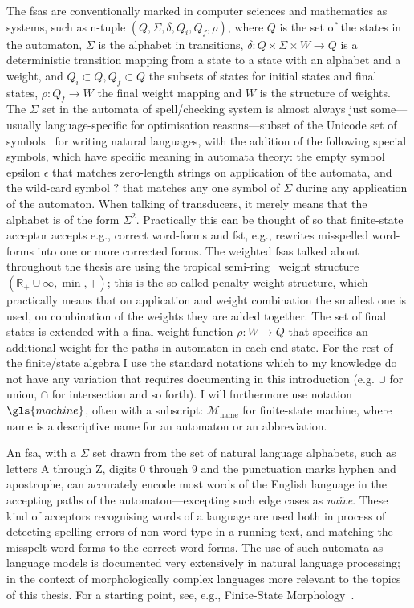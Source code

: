 \documentclass[officiallayout]{unihelcompling}
\begin{document}
The \glspl{fsa} are conventionally marked in computer sciences and mathematics
as systems, such as n-tuple $(Q, \Sigma, \delta, Q_i, Q_f, \rho)$, where $Q$ is
the set of the states in the automaton, $\Sigma$ is the alphabet in
transitions, $\delta: Q \times \Sigma \times W \rightarrow Q$ is a
deterministic transition mapping from a state to a state with an alphabet and a
weight, and $Q_i \subset Q, Q_f \subset Q$ the subsets of states for initial
states and final states, $\rho: Q_f \rightarrow W$ the final weight mapping and
$W$ is the structure of weights.  The $\Sigma$ set in the automata of
spell\-/checking system is almost always just some---usually language-specific
for optimisation reasons---subset of the Unicode set of symbols~\citep{unicode}
for writing natural languages, with the addition of the following special
symbols, which have specific meaning in automata theory: the empty symbol
epsilon $\epsilon$ that matches zero-length strings on application of the
automata, and the wild-card symbol $?$ that matches any one symbol of $\Sigma$
during any application of the automaton.  When talking of transducers, it
merely means that the alphabet is of the form $\Sigma^2$. Practically this can
be thought of so that \gls{finite-state acceptor} accepts e.g., correct
word-forms and \gls{fst}, e.g., rewrites misspelled word-forms into one or more
corrected forms.  The weighted \glspl{fsa} talked about throughout the thesis
are using the \gls{tropical semi-ring}~\citep{mohri1997finitestate} weight
structure $(\mathbb{R}_+ \cup \infty, \min, +)$; this is the so-called penalty
weight structure, which practically means that on application and weight
combination the smallest one is used, on combination of the weights they are
added together. The set of final states is extended with a final weight
function $\rho: W \rightarrow Q$ that specifies an additional weight for the
paths in automaton in each end state. For the rest of the finite\-/state
algebra I use the standard notations which to my knowledge do not have any
variation that requires documenting in this introduction (e.g.  $\cup$ for
union, $\cap$ for intersection and so forth). I will furthermore use notation
$\gls{machine}$, often with a subscript: $\mathcal{M}_\mathrm{name}$ for
finite-state machine, where $\mathrm{name}$ is a descriptive name for an
automaton or an abbreviation.

An \gls{fsa}, with a $\Sigma$ set drawn from the set of natural
language alphabets, such as letters A through Z, digits 0 through 9 and the
punctuation marks hyphen and apostrophe, can accurately encode most words of
the English language in the accepting paths of the automaton---excepting such
edge cases as \emph{naïve}. These kind of acceptors recognising words of a language are used both in process
of detecting spelling errors of non-word type in a running text, and matching
the misspelt word forms to the correct word-forms. The use of such automata as
language models is documented very extensively in natural language processing;
in the context of morphologically complex languages more relevant to the topics of
this thesis. For a starting point, see, e.g., Finite-State Morphology~\citep{beesley2003finite,beesley2004morphological}.
\end{document}
